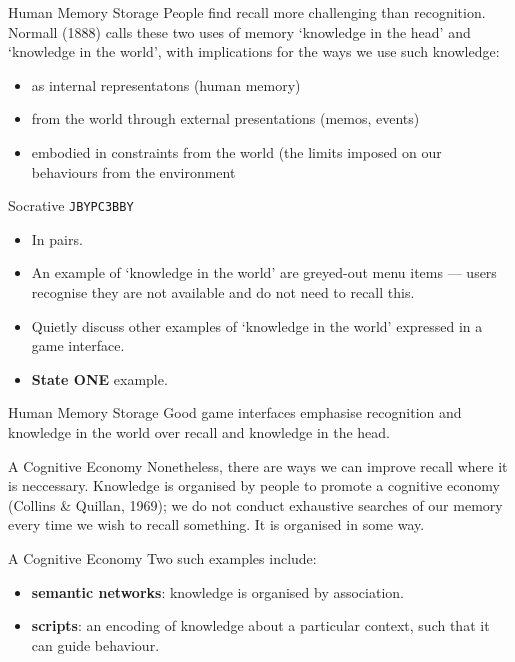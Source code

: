 \begin{frame}{Human Memory Storage}
	People find recall more challenging than recognition. Normall (1888) calls these two uses of memory `knowledge in the head' and
	`knowledge in the world', with implications for the ways we use such knowledge:

	\begin{itemize}
		\item as internal representatons (human memory)
		\item from the world through external presentations (memos, events)
		\item embodied in constraints from the world (the limits imposed on our behaviours from the environment
	\end{itemize}
\end{frame}

\begin{frame}[fragile]{Socrative \texttt{JBYPC3BBY}}
	\begin{itemize}
		\item In pairs.
		\item An example of `knowledge in the world' are greyed-out menu items --- users recognise they are not available and do not need to recall this.
		\item Quietly discuss other examples of `knowledge in the world' expressed in a game interface.
		\item \textbf{State ONE} example.
	\end{itemize}
\end{frame}

\begin{frame}{Human Memory Storage}
	Good game interfaces emphasise recognition and knowledge in the world over recall and knowledge in the head.
\end{frame}

\begin{frame}{A Cognitive Economy}
	Nonetheless, there are ways we can improve recall where it is neccessary. Knowledge is organised by people to promote a cognitive economy (Collins \& Quillan, 1969); 
	we do not conduct exhaustive searches of our memory every time we wish to recall something. It is organised in some way.
\end{frame}

\begin{frame}{A Cognitive Economy}
	Two such examples include:

	\begin{itemize}
		\item \textbf{semantic networks}: knowledge is organised by association.
		\item \textbf{scripts}: an encoding of knowledge about a particular context, such that it can guide behaviour.
	\end{itemize}
\end{frame}

